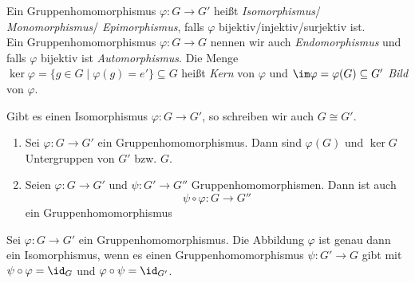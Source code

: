 \begin{defn*}      
	Ein Gruppenhomomorphismus $ \varphi: G \to G' $ heißt \emph{Isomorphismus}/ \emph{Monomorphismus}/ \emph{Epimorphismus}, falls $\varphi$ bijektiv/injektiv/surjektiv ist.\\
	Ein Gruppenhomomorphismus $\varphi: G \to G$ nennen wir auch \emph{Endomorphismus} und falls $\varphi$ bijektiv ist \emph{Automorphismus}.
	Die Menge $ \ker \varphi = \{ g \in G \mid \varphi(g) = e' \} \subseteq G $ heißt \emph{Kern} von $\varphi$ und $ \im \varphi = \varphi(G) \subseteq G' $ \emph{Bild} von $\varphi$.
\end{defn*}

\begin{notat*}
	Gibt es einen Isomorphismus $\varphi: G \to G'$, so schreiben wir auch $G \cong G'$.
\end{notat*}

\begin{rem*}
	\begin{enumerate}[label=\textcircled{\alph*}]
		\item Sei $ \varphi: G \to G' $ ein Gruppenhomomorphismus. Dann sind $\varphi(G)$ und $\ker G$ Untergruppen von $G'$ bzw. $G$.
		\item Seien $ \varphi: G \to G' $ und $ \psi: G' \to G'' $ Gruppenhomomorphismen. Dann ist auch
			\[ \psi \circ \varphi: G \to G'' \]
			ein Gruppenhomomorphismus
	\end{enumerate}
\end{rem*}

\begin{lem}
	Sei $ \varphi: G \to G' $ ein Gruppenhomomorphismus. Die Abbildung $ \varphi $ ist genau dann ein Isomorphismus, wenn es einen Gruppenhomomorphismus $ \psi: G' \to G $ gibt mit $ \psi \circ \varphi = \id_G $ und $ \varphi \circ \psi = \id_{G'} $.
\end{lem}

